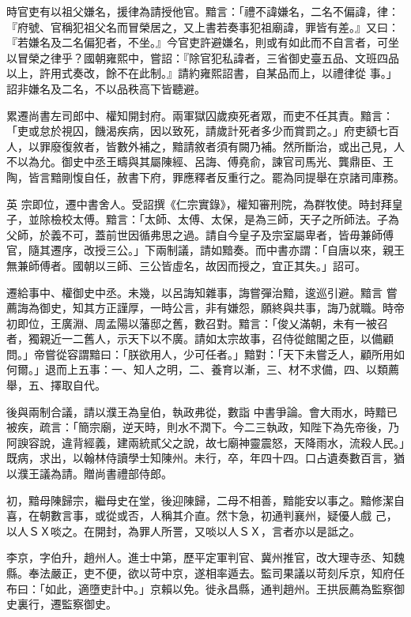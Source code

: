 \begin{pinyinscope}
 時官吏有以祖父嫌名，援律為請授他官。黯言：「禮不諱嫌名，二名不偏諱，律：『府號、官稱犯祖父名而冒榮居之，又上書若奏事犯祖廟諱，罪皆有差。』又曰：『若嫌名及二名偏犯者，不坐。』今官吏許避嫌名，則或有如此而不自言者，可坐以冒榮之律乎？國朝雍熙中，嘗詔：『除官犯私諱者，三省御史臺五品、文班四品以上，許用式奏改，餘不在此制。』請約雍熙詔書，自某品而上，以禮律從
 事。」詔非嫌名及二名，不以品秩高下皆聽避。



 累遷尚書左司郎中、權知開封府。兩軍獄囚歲瘐死者眾，而吏不任其責。黯言：「吏或怠於視囚，饑渴疾病，因以致死，請歲計死者多少而賞罰之。」府吏額七百人，以罪廢復敘者，皆數外補之，黯請敘者須有闕乃補。然所斷治，或出己見，人不以為允。御史中丞王疇與其屬陳經、呂誨、傅堯俞，諫官司馬光、龔鼎臣、王陶，皆言黯剛愎自任，赦書下府，罪應釋者反重行之。罷為同提舉在京諸司庫務。



 英
 宗即位，遷中書舍人。受詔撰《仁宗實錄》，權知審刑院，為群牧使。時封拜皇子，並除檢校太傅。黯言：「太師、太傅、太保，是為三師，天子之所師法。子為父師，於義不可，蓋前世因循弗思之過。請自今皇子及宗室屬卑者，皆毋兼師傅官，隨其遷序，改授三公。」下兩制議，請如黯奏。而中書亦謂：「自唐以來，親王無兼師傅者。國朝以三師、三公皆虛名，故因而授之，宜正其失。」詔可。



 遷給事中、權御史中丞。未幾，以呂誨知雜事，誨嘗彈治黯，逡巡引避。黯言
 嘗薦誨為御史，知其方正謹厚，一時公言，非有嫌怨，願終與共事，誨乃就職。時帝初即位，王廣淵、周孟陽以藩邸之舊，數召對。黯言：「俊乂滿朝，未有一被召者，獨親近一二舊人，示天下以不廣。請如太宗故事，召侍從館閣之臣，以備顧問。」帝嘗從容謂黯曰：「朕欲用人，少可任者。」黯對：「天下未嘗乏人，顧所用如何爾。」退而上五事：一、知人之明，二、養育以漸，三、材不求備，四、以類薦舉，五、擇取自代。



 後與兩制合議，請以濮王為皇伯，執政弗從，數詣
 中書爭論。會大雨水，時黯已被疾，疏言：「簡宗廟，逆天時，則水不潤下。今二三執政，知陛下為先帝後，乃阿諛容說，違背經義，建兩統貳父之說，故七廟神靈震怒，天降雨水，流殺人民。」既病，求出，以翰林侍讀學士知陳州。未行，卒，年四十四。口占遺奏數百言，猶以濮王議為請。贈尚書禮部侍郎。



 初，黯母陳歸宗，繼母史在堂，後迎陳歸，二母不相善，黯能安以事之。黯修潔自喜，在朝數言事，或從或否，人稱其介直。然卞急，初通判襄州，疑優人戲
 己，以人ＳＸ啖之。在開封，為罪人所詈，又啖以人ＳＸ，言者亦以是詆之。



 李京，字伯升，趙州人。進士中第，歷平定軍判官、冀州推官，改大理寺丞、知魏縣。奉法嚴正，吏不便，欲以苛中京，遂相率遁去。監司果議以苛刻斥京，知府任布曰：「如此，適墮吏計中。」京賴以免。徙永昌縣，通判趙州。王拱辰薦為監察御史裏行，遷監察御史。




\end{pinyinscope}
